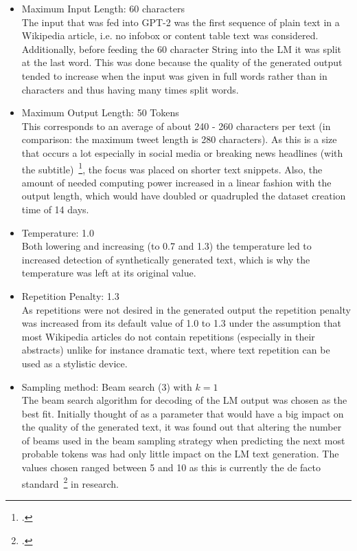 \begin{itemize}
	\item Maximum Input Length: 60 characters \\
	The input that was fed into GPT-2 was the first sequence of plain text in a Wikipedia article, i.e. no infobox or content table text was considered. Additionally, before feeding the 60 character String into the LM it was split at the last word. This was done because the quality of the generated output tended to increase when the input was given in full words rather than in characters and thus having many times split words.
	\item Maximum Output Length: 50 Tokens \\
	This corresponds to an average of about 240 - 260 characters per text (in comparison: the maximum tweet length is 280 characters). As this is a size that occurs a lot especially in social media or breaking news headlines (with the subtitle)~\footcite{lee2014proven}, the focus was placed on shorter text snippets. Also, the amount of needed computing power increased in a linear fashion with the output length, which would have doubled or quadrupled the dataset creation time of 14 days.
	\item Temperature: 1.0 \\
	Both lowering and increasing (to 0.7 and 1.3) the temperature led to increased detection of synthetically generated text, which is why the temperature was left at its original value.
	\item Repetition Penalty: 1.3 \\
	As repetitions were not desired in the generated output the repetition penalty was increased from its default value of 1.0 to 1.3 under the assumption that most Wikipedia articles do not contain repetitions (especially in their abstracts) unlike for instance dramatic text, where text repetition can be used as a stylistic device.
	\item Sampling method: Beam search (3) with $ k = 1 $ \\
	The beam search algorithm for decoding of the LM output was chosen as the best fit. Initially thought of as a parameter that would have a big impact on the quality of the generated text, it was found out that altering the number of beams used in the beam sampling strategy when predicting the next most probable tokens was had only little impact on the LM text generation. The values chosen ranged between 5 and 10 as this is currently the de facto standard~\footcite{DBLP:journals/corr/FreitagA17} in research.
\end{itemize}

